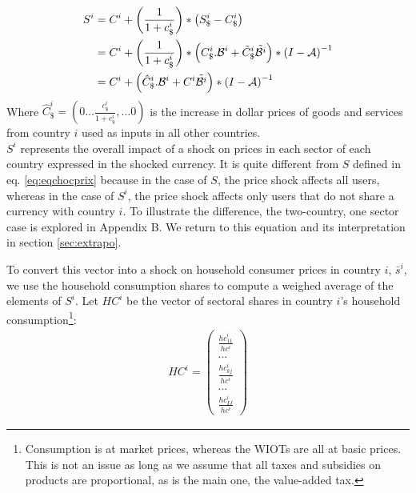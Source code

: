 \documentclass[11pt,a4paper]{article}
\begin{document}
\begin{equation}
\begin{aligned}
	S^i&=C^i  + \left( \frac{1}{1+{{c}_\$^i}}\right)*\left({S_\$^i}-{{C}_{\$}^i}\right)\\
	&=C^i + \left( \frac{1}{1+{{c}_\$^i}}\right)*\left(C_\$^i.{\cal B}^i+{\tilde{C}_\$^i}{\tilde{{\cal B}^i}}\right)*{{(I-{\cal A})}^{-1}} 	\\
	&=C^i	+ \left(\hat{C}^i_\$.{\cal B}^i+{C^i}{\tilde{{\cal B}^i}}\right)*{{(I-{\cal A})}^{-1}}	
\label{eq:eqdomcurrency}
\end{aligned}
\end{equation}
Where $\hat{C}^i_\$=\left(0 \ldots \frac{c_\$^i}{1+c_\$^i},\ldots 0 \right)$ is the increase in dollar prices of goods and services from country $i$ used as inputs in all other countries.\\ 
$S^i$ represents the overall impact of a shock on prices in each sector of each country expressed in the shocked currency.
It is quite different from $S$ defined in eq. \eqref{eq:eqchocprix} because in the case of $S$, the price shock affects all users, whereas in the case of $S^i$, the price shock affects only users that do not share a currency with country $i$. 
To illustrate the difference, the two-country, one sector case is explored in Appendix B. We return to this equation and its interpretation in section  \ref{sec:extrapo}.

To convert this vector into a shock on household consumer prices in country $i$, $\bar{s}^i$, we use the household consumption shares to compute a weighed average of the elements of $S^i$.
Let $HC^i$ be the vector of sectoral shares in country $i$'s household consumption\footnote{Consumption is at market prices, whereas the WIOTs are all at basic prices. This is not an issue as long as we assume that all taxes and subsidies on products are proportional, as is the main one, the value-added tax.}:
\begin{eqnarray*}
HC^i=\left( 
	\begin{array}{c}
	\frac{{hc}_{11}^i}{hc^i} \\
	...\\
	\frac{{hc}_{kj}^i}{hc^i}\\
	...\\
	\frac{{hc}_{IJ}^i}{hc^i}
	 \end{array}
	 \right)
\end{eqnarray*}
\end{document}
